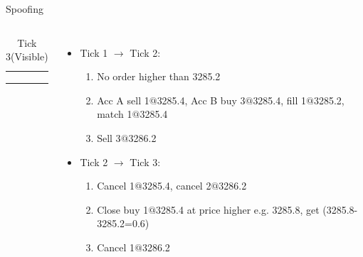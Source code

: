 \begin{frame}{Spoofing}
\begin{columns}
\begin{table}
\begin{subtable}[b]{0.4\textwidth}
{\begin{tabular}{c|c}
          \arrayrulecolor{orange}\hline
          \rowcolor{mypink}
          {} & {}\\
          \arrayrulecolor{orange}\hline
          \rowcolor{mypink}
          {} & {}\\
          \arrayrulecolor{orange}\hline
        \end{tabular}
      }
      \caption*{\scriptsize{Tick 3(Visible)}}
    \end{subtable}
  \end{table}
  \column{5cm}
  \begin{itemize}
  \item Tick 1 $\to$ Tick 2:
    \begin{enumerate}[<+-|alert@+>]
    \item No order higher than 3285.2
    \item Acc A sell 1$@$3285.4, Acc B buy 3$@$3285.4, fill 1$@$3285.2, match 1$@$3285.4
    \item Sell 3$@$3286.2
    \end{enumerate}
  \item Tick 2 $\to$ Tick 3:
    \begin{enumerate}[<+-|alert@+>]
    \item Cancel 1$@$3285.4, cancel 2$@$3286.2
    \item Close buy 1$@$3285.4 at price higher e.g. 3285.8, get (3285.8-3285.2=0.6)
    \item Cancel 1$@$3286.2
    \end{enumerate}
  \end{itemize}
  \end{columns}
\end{frame}

